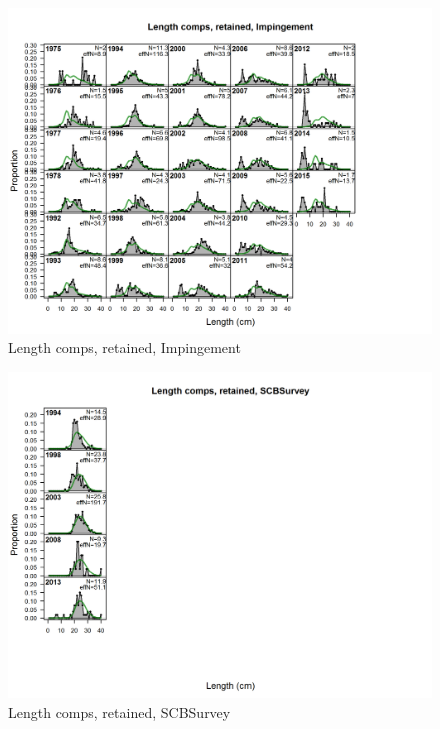 \documentclass[12pt,]{article}
\begin{document}
\begin{figure}[htbp]
\centering
\includegraphics{./r4ss/plots_mod1/comp_lenfit_flt10mkt2.png}
\caption{Length comps, retained, Impingement
\label{fig:mod1_11_comp_lenfit_flt10mkt2}}
\end{figure}

\begin{figure}[htbp]
\centering
\includegraphics{./r4ss/plots_mod1/comp_lenfit_flt11mkt2.png}
\caption{Length comps, retained, SCBSurvey
\label{fig:mod1_12_comp_lenfit_flt11mkt2}}
\end{figure}

\newpage

\color{black}
\end{document}
